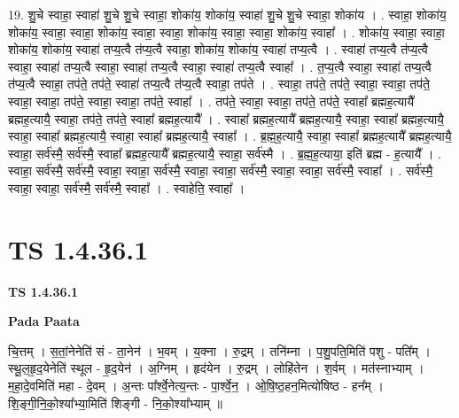 \documentclass[17pt]{extarticle}
\begin{document}
19. शु॒चे स्वाहा॒ स्वाहा॑ शु॒चे शु॒चे स्वाहा॒ शोका॑य॒ शोका॑य॒ स्वाहा॑ शु॒चे शु॒चे स्वाहा॒ शोका॑य । . स्वाहा॒ शोका॑य॒ शोका॑य॒ स्वाहा॒ स्वाहा॒ शोका॑य॒ स्वाहा॒ स्वाहा॒ शोका॑य॒ स्वाहा॒ स्वाहा॒ शोका॑य॒ स्वाहा᳚ । . शोका॑य॒ स्वाहा॒ स्वाहा॒ शोका॑य॒ शोका॑य॒ स्वाहा॑ तप्य॒त्वै त॑प्य॒त्वै स्वाहा॒ शोका॑य॒ शोका॑य॒ स्वाहा॑ तप्य॒त्वै । . स्वाहा॑ तप्य॒त्वै त॑प्य॒त्वै स्वाहा॒ स्वाहा॑ तप्य॒त्वै स्वाहा॒ स्वाहा॑ तप्य॒त्वै स्वाहा॒ स्वाहा॑ तप्य॒त्वै स्वाहा᳚ । . त॒प्य॒त्वै स्वाहा॒ स्वाहा॑ तप्य॒त्वै त॑प्य॒त्वै स्वाहा॒ तप॑ते॒ तप॑ते॒ स्वाहा॑ तप्य॒त्वै त॑प्य॒त्वै स्वाहा॒ तप॑ते । . स्वाहा॒ तप॑ते॒ तप॑ते॒ स्वाहा॒ स्वाहा॒ तप॑ते॒ स्वाहा॒ स्वाहा॒ तप॑ते॒ स्वाहा॒ स्वाहा॒ तप॑ते॒ स्वाहा᳚ । . तप॑ते॒ स्वाहा॒ स्वाहा॒ तप॑ते॒ तप॑ते॒ स्वाहा᳚ ब्रह्मह॒त्यायै᳚ ब्रह्मह॒त्यायै॒ स्वाहा॒ तप॑ते॒ तप॑ते॒ स्वाहा᳚ ब्रह्मह॒त्यायै᳚ । . स्वाहा᳚ ब्रह्मह॒त्यायै᳚ ब्रह्मह॒त्यायै॒ स्वाहा॒ स्वाहा᳚ ब्रह्मह॒त्यायै॒ स्वाहा॒ स्वाहा᳚ ब्रह्मह॒त्यायै॒ स्वाहा॒ स्वाहा᳚ ब्रह्मह॒त्यायै॒ स्वाहा᳚ । . ब्र॒ह्म॒ह॒त्यायै॒ स्वाहा॒ स्वाहा᳚ ब्रह्मह॒त्यायै᳚ ब्रह्मह॒त्यायै॒ स्वाहा॒ सर्व॑स्मै॒ सर्व॑स्मै॒ स्वाहा᳚ 
ब्रह्मह॒त्यायै᳚ ब्रह्मह॒त्यायै॒ स्वाहा॒ सर्व॑स्मै । . ब्र॒ह्म॒ह॒त्याया॒ इति॑ ब्रह्म - ह॒त्यायै᳚ । . स्वाहा॒ सर्व॑स्मै॒ सर्व॑स्मै॒ स्वाहा॒ स्वाहा॒ सर्व॑स्मै॒ स्वाहा॒ स्वाहा॒ सर्व॑स्मै॒ स्वाहा॒ स्वाहा॒ सर्व॑स्मै॒ स्वाहा᳚ । . सर्व॑स्मै॒ स्वाहा॒ स्वाहा॒ सर्व॑स्मै॒ सर्व॑स्मै॒ स्वाहा᳚ । . स्वाहेति॒ स्वाहा᳚ । \newline
\pagebreak
{}

\section{ TS 1.4.36.1 }

\textbf{TS 1.4.36.1 } \newline

\textbf{Pada Paata} \newline

चि॒त्तम् । स॒तां॒नेनेति॑ सं - ता॒नेन॑ । भ॒वम् । य॒क्ना । रु॒द्रम् । तनि॑म्ना । प॒शु॒पति॒मिति॑ पशु - पति᳚म् । स्थू॒ल॒हृ॒द॒येनेति॑ स्थूल - हृ॒द॒येन॑ । अ॒ग्निम् । हृद॑येन । रु॒द्रम् । लोहि॑तेन । श॒र्वम् । मत॑स्नाभ्याम् । म॒हा॒दे॒वमिति॑ महा - दे॒वम् । अ॒न्तः पा᳚र्श्वे॒नेत्य॒न्तः - पा॒र्श्वे॒न॒ । ओ॒षि॒ष्ठ॒हन॒मित्यो॑षिष्ठ - हन᳚म् । शि॒ङ्गी॒नि॒को॒श्या᳚भ्या॒मिति॑ शिङ्गी - नि॒को॒श्या᳚भ्याम् ॥  \newline
\end{document}
